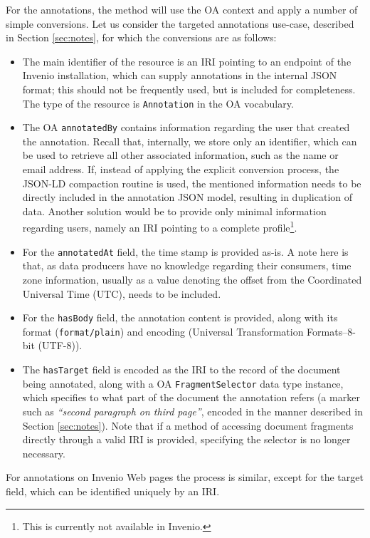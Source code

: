 For the annotations, the method will use the OA context and apply a number of
simple conversions. Let us consider the targeted annotations use-case,
described in Section \ref{sec:notes}, for which the conversions are as follows:
\begin{itemize}
  \item The main identifier of the resource is an IRI pointing to an endpoint of
        the Invenio installation, which can supply annotations in the internal
        JSON format; this should not be frequently used, but is included for
        completeness. The type of the resource is \texttt{Annotation} in the
        OA vocabulary.
  \item The OA \texttt{annotatedBy} contains information regarding
        the user that created the annotation. Recall that, internally, we store
        only an identifier, which can be used to retrieve all other associated
        information, such as the name or email address. If, instead of applying
        the explicit conversion process, the JSON-LD compaction routine is
        used, the mentioned information needs to be directly included in
        the annotation JSON model, resulting in duplication of data. Another
        solution would be to provide only minimal information regarding users,
        namely an IRI pointing to a complete profile\footnote{This is currently
        not available in Invenio.}.
  \item For the \texttt{annotatedAt} field, the time stamp is provided as-is. A
        note here is that, as data producers have no knowledge regarding their
        consumers, time zone information, usually as a value denoting the offset
        from the Coordinated Universal Time (UTC), needs to be included.
  \item For the \texttt{hasBody} field, the annotation content is provided, along
        with its format (\texttt{format/plain}) and encoding (Universal
        Transformation Formats--8-bit (UTF-8)).
  \item The \texttt{hasTarget} field is encoded as the IRI to the record of the
        document being annotated, along with a OA \texttt{FragmentSelector}
        data type instance, which specifies to what part of the document the
        annotation refers (a marker such as \textit{``second paragraph on
        third page''}, encoded in the manner described in
        Section \ref{sec:notes}). Note that if a method of accessing document
        fragments directly through a valid IRI is provided, specifying the
        selector is no longer necessary.
\end{itemize}
For annotations on Invenio Web pages the process is similar, except for the
target field, which can be identified uniquely by an IRI.

